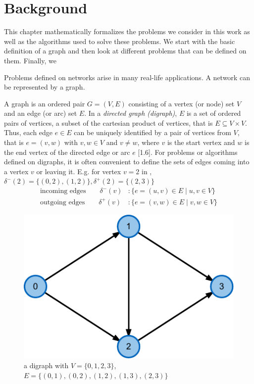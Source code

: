 \chapter{Background}\label{ch:3}
This chapter mathematically formalizes the problems we consider in this work as well as the algorithms used to solve these problems. We start with the basic definition of a graph and then look at different problems that can be defined on them. Finally, we  

Problems defined on networks arise in many real-life applications. A network can be represented by a graph.

\newcommand{\Ein}[1]{\delta^-(#1)}
\newcommand{\Eout}[1]{\delta^+(#1)}
\newcommand{\ein}{{e_{\text{in}}}}
\newcommand{\eout}{{e_{\text{out}}}}

\newcommand{\setfont}[1]{#1}

\begin{definition}
A graph is an ordered pair $G = (V, E)$ consisting of a vertex (or node) set $V$ and an edge (or arc) set $E$. In a \textit{directed graph (digraph)}, $E$ is a set of ordered pairs of vertices, a subset of the cartesian product of vertices, that is $E \subseteq V \times V$. Thus, each edge $e \in E$ can be uniquely identified by a pair of vertices from $V$, that is $e=(v,w)$ with $v,w \in V$ and $v \neq w$, where $v$ is the start vertex and $w$ is the end vertex of the directed edge or arc $e$ \cite{jungnickel2013graphs}[1.6]. For problems or algorithms defined on digraphs, it is often convenient to define the sets of edges coming into a vertex $v$ or leaving it.
 E.g. for vertex $v=2$ in , $\Ein{2}=\{(0,2),(1,2)\}, \Eout{2}=\{(2,3)\}$
\begin{align}
\text{incoming edges} \quad \quad \Ein{v}  &: \{ e=(u,v) \in E \; | \; u,v \in V \}  \\
\text{outgoing edges} \quad \quad \Eout{v} &: \{ e=(v,w) \in E \; | \; v,w \in V \}
\end{align}
\end{definition}

\begin{figure}
\centering
	\includegraphics{fig/graph-editor}
	\caption{a digraph with $V=\{0,1,2,3\}$, $E=\{(0,1),(0,2),(1,2),(1,3),(2,3)\}$}
	\label{fig:graph}
\end{figure}



